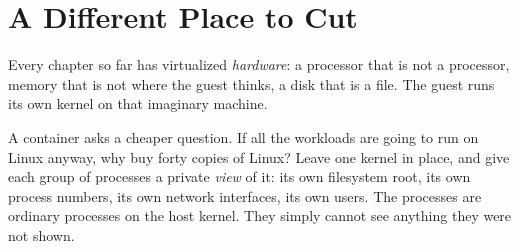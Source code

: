 \section{A Different Place to Cut}

Every chapter so far has virtualized \emph{hardware}: a processor that is not a
processor, memory that is not where the guest thinks, a disk that is a file.
The guest runs its own kernel on that imaginary machine.

A container asks a cheaper question. If all the workloads are going to run on
Linux anyway, why buy forty copies of Linux? Leave one kernel in place, and
give each group of processes a private \emph{view} of it: its own filesystem
root, its own process numbers, its own network interfaces, its own users. The
processes are ordinary processes on the host kernel. They simply cannot see
anything they were not shown.

